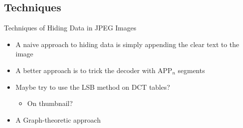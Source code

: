 \subsection{Techniques}
\begin{frame}{Techniques of Hiding Data in JPEG Images}{}
	\begin{itemize}
		\item<1 -> A naive approach to hiding data is simply appending the clear text to the image
		\item<2 -> A better approach is to trick the decoder with APP$_n$ segments
		\item<3 -> Maybe try to use the LSB method on DCT tables?
		\begin{itemize}\item<4 -> On thumbnail?\end{itemize}
		\item<5 -> A Graph-theoretic approach
	\end{itemize}
\end{frame}
